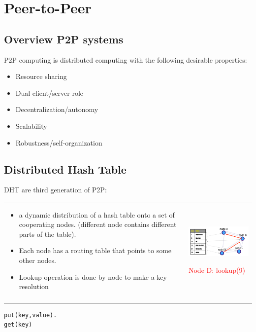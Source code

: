 \section{Peer-to-Peer}

\subsection{Overview P2P systems}
P2P computing is distributed computing  with the following desirable properties:
\begin{itemize}
	\item Resource sharing
	\item Dual client/server role
	\item Decentralization/autonomy
	\item Scalability
	\item Robustness/self-organization
\end{itemize}

\subsection{Distributed Hash Table}

DHT are third generation of P2P:

\begin{tabular}{m{10cm}m{6cm}}
\begin{itemize}
    \item a dynamic distribution of a hash table onto a set of cooperating nodes.
        (different node contains different parts of the table).
    \item Each node has a routing table that points to some other nodes.
    \item Lookup operation is done by node to make a key resolution
\end{itemize}
&
    \includegraphics[width=6cm]{img/DHT.png}

     \textcolor{red}{Node D: lookup(9)}\\
    \\
\end{tabular}

\begin{lstlisting}[caption=Interface DHT]
put(key,value).
get(key)
\end{lstlisting}

